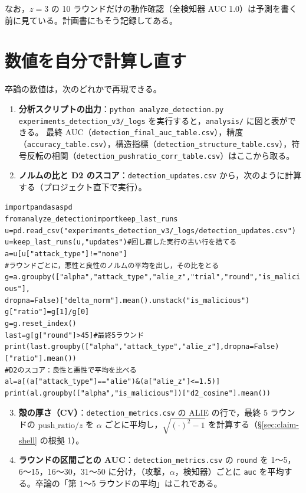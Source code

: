 \documentclass[a4j, dvipdfmx]{jsarticle}  %
\newenvironment{cmd}{\par\vspace{0.3em}\begin{alltt}\small}{\end{alltt}\vspace{0.3em}\par}
\begin{document}
なお，$z = 3$ の 10 ラウンドだけの動作確認（全検知器 AUC 1.0）は予測を書く前に見ている。計画書にもそう記録してある。

\section{数値を自分で計算し直す}
\label{sec:claims-recompute}

卒論の数値は，次のどれかで再現できる。
\begin{enumerate}
  \item \textbf{分析スクリプトの出力}：\texttt{python analyze\_detection.py experiments\_detection\_v3/\_logs} を実行すると，\texttt{analysis/} に図と表ができる。
        最終 AUC（\texttt{detection\_final\_auc\_table.csv}），精度（\texttt{accuracy\_table.csv}），構造指標（\texttt{detection\_structure\_table.csv}），符号反転の相関（\texttt{detection\_pushratio\_corr\_table.csv}）はここから取る。
  \item \textbf{ノルムの比と D2 のスコア}：\texttt{detection\_updates.csv} から，次のように計算する（プロジェクト直下で実行）。
\end{enumerate}

\begin{cmd}
import pandas as pd
from analyze_detection import keep_last_runs
u = pd.read_csv("experiments_detection_v3/_logs/detection_updates.csv")
u = keep_last_runs(u, "updates")            # 回し直した実行の古い行を捨てる
a = u[u["attack_type"] != "none"]
# ラウンドごとに，悪性と良性のノルムの平均を出し，その比をとる
g = a.groupby(["alpha", "attack_type", "alie_z", "trial", "round", "is_malicious"],
              dropna=False)["delta_norm"].mean().unstack("is_malicious")
g["ratio"] = g[1] / g[0]
g = g.reset_index()
last = g[g["round"] > 45]                    # 最終 5 ラウンド
print(last.groupby(["alpha", "attack_type", "alie_z"], dropna=False)["ratio"].mean())
# D2 のスコア：良性と悪性で平均を比べる
al = a[(a["attack_type"] == "alie") & (a["alie_z"] <= 1.5)]
print(al.groupby(["alpha", "is_malicious"])["d2_cosine"].mean())
\end{cmd}

\begin{enumerate}
  \setcounter{enumi}{2}
  \item \textbf{殻の厚さ（CV）}：\texttt{detection\_metrics.csv} の ALIE の行で，最終 5 ラウンドの $\mathrm{push\_ratio}/z$ を $\alpha$ ごとに平均し，$\sqrt{(\cdot)^2 - 1}$ を計算する（\S\ref{sec:claim-shell} の根拠 1）。
  \item \textbf{ラウンドの区間ごとの AUC}：\texttt{detection\_metrics.csv} の \texttt{round} を 1〜5，6〜15，16〜30，31〜50 に分け，（攻撃，$\alpha$，検知器）ごとに \texttt{auc} を平均する。卒論の「第 1〜5 ラウンドの平均」はこれである。
\end{enumerate}
\end{document}
